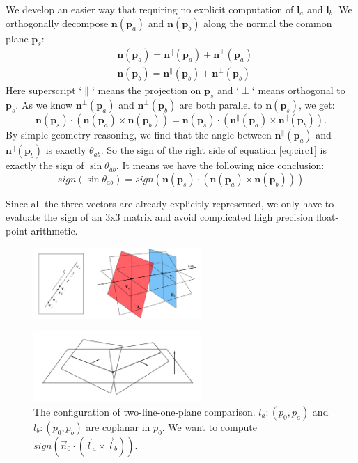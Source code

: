 \documentclass[10pt,journal,compsoc]{IEEEtran}
\begin{document}
We develop an easier way that requiring no explicit computation of $\bm{l}_a$ and $\bm{l}_b$. We orthogonally decompose $\bm{n}(\bm{p}_a)$ and $\bm{n}(\bm{p}_b)$ along the normal the common plane $\bm{p}_s$:
\begin{equation}
\begin{split}
&\bm{n}(\bm{p}_a)= \bm{n}^\parallel(\bm{p}_a) + \bm{n}^\perp(\bm{p}_a)\\
&\bm{n}(\bm{p}_b)= \bm{n}^\parallel(\bm{p}_b) + \bm{n}^\perp(\bm{p}_b)
\end{split}
\end{equation}
Here superscript `$\parallel$` means the projection on $\bm{p}_s$ and `$\perp$` means orthogonal to $\bm{p}_s$. As we know $\bm{n}^\perp(\bm{p}_a)$ and $\bm{n}^\perp(\bm{p}_b)$ are both parallel to $\bm{n}(\bm{p}_s)$, we get:
\begin{equation}
\label{eq:circ1}
\bm{n}(\bm{p}_s) \cdot (\bm{n}(\bm{p}_a) \times \bm{n}(\bm{p}_b)) = \bm{n}(\bm{p}_s) \cdot (\bm{n}^\parallel(\bm{p}_a) \times \bm{n}^\parallel(\bm{p}_b)).
\end{equation}
By simple geometry reasoning, we find that the angle between $\bm{n}^\parallel(\bm{p}_a)$ and $\bm{n}^\parallel(\bm{p}_b)$ is exactly $\theta_{ab}$. So the sign of the right side of equation \ref{eq:circ1} is exactly the sign of $\sin{\theta_{ab}}$. It means we have the following nice conclusion:
\begin{equation}
\label{eq:circ2}
sign(\sin{\theta_{ab}})=  sign(\bm{n}(\bm{p}_s)\cdot(\bm{n}(\bm{p}_a) \times \bm{n}(\bm{p}_b)))
\end{equation}

Since all the three vectors are already explicitly represented, we only have to evaluate the sign of an 3x3 matrix and avoid complicated high precision float-point arithmetic.
\begin{figure}
  \centering
  \includegraphics[width=2.5in]{twopointoneline}\\
  \caption{{\color{red}{Sketch: config of two point one line comparison}}}\label{fig:twopointoneline}
\end{figure}

\begin{figure}[t]
\centering
\includegraphics[width=2.5in]{circularorder}
\caption{The configuration of two-line-one-plane comparison. $l_a\colon(p_0, p_a)$ and $l_b\colon(p_0, p_b)$ are coplanar in $p_0$. We want to compute $sign(\vec{n}_0 \cdot (\vec{l}_a \times \vec{l}_b))$.}
\label{fig:circularorder}
\end{figure}
\end{document}
